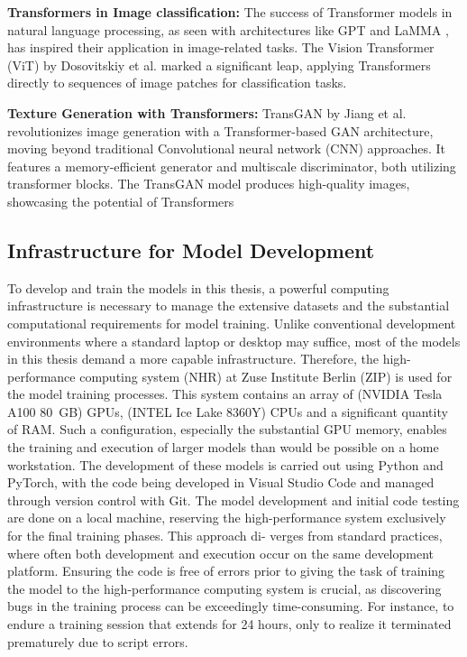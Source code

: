\textbf{Transformers in Image classification:} 
The success of Transformer models in natural language processing, as seen with architectures like GPT \autocite{GPT2radford2019} and LaMMA \autocite{touvron2023llama}, has inspired their application in image-related tasks. The Vision Transformer (ViT) by Dosovitskiy et al. \autocite{dosovitskiy2021image} marked a significant leap, applying Transformers directly to sequences of image patches for classification tasks.

\textbf{Texture Generation with Transformers:}
TransGAN by Jiang et al. \autocite{jiang2021transgan} revolutionizes image generation with a Transformer-based GAN architecture, moving beyond traditional Convolutional neural network (CNN) approaches. It features a memory-efficient generator and multiscale discriminator, both utilizing transformer blocks. The TransGAN model produces high-quality images, showcasing the potential of Transformers

\subsection{Infrastructure for Model Development}

To develop and train the models in this thesis, a powerful computing infrastructure is necessary to manage the extensive datasets and the substantial computational requirements for model training. Unlike conventional development environments where a standard laptop or desktop may suffice, most of the models in this thesis demand a more capable infrastructure. Therefore, the high-performance computing system (NHR) at  Zuse Institute Berlin (ZIP) is used for the model training processes. This system contains an array of (NVIDIA Tesla A100 80 GB) GPUs, (INTEL Ice Lake 8360Y) CPUs and a significant quantity of RAM. Such a configuration, especially the substantial GPU memory, enables the training and execution of larger models than would be possible on a home workstation. The development of these models is carried out using Python and PyTorch, with the code being developed in Visual Studio Code and managed through version control with Git. The model development and initial code testing are done on a local machine, reserving the high-performance system exclusively for the final training phases. This approach di- verges from standard practices, where often both development and execution occur on the same development platform. Ensuring the code is free of errors prior to giving the task of training the model to the high-performance computing system is crucial, as discovering bugs in the training process can be exceedingly time-consuming. For instance, to endure a training session that extends for 24 hours, only to realize it terminated prematurely due to script errors.

